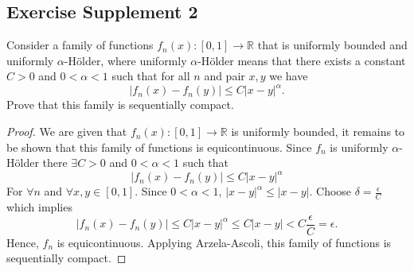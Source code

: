 \documentclass{tufte-book}
\theoremstyle{mytheoremstyle}
\theoremstyle{mylemstyle}
\theoremstyle{mydefstyle}
\begin{document}
\subsection{Exercise Supplement 2}
Consider a family of functions $f_n(x): [0,1] \to \mathbb{R}$ that is uniformly bounded and uniformly $\alpha$-H{\"o}lder, where uniformly $\alpha$-H{\"o}lder means that there exists a constant $C>0$ and $0<\alpha<1$ such that for all $n$ and pair $x,y$ we have
\[|f_n(x) - f_n(y)| \leq C|x-y|^\alpha. \]
Prove that this family is sequentially compact.

\begin{proof}
We are given that $f_n(x): [0,1] \to \mathbb{R}$ is uniformly bounded, it remains to be shown that this family of functions is equicontinuous.  Since $f_n$ is uniformly $\alpha$-H{\"o}lder there $\exists C>0$ and $0<\alpha<1$ such that 
\[|f_n(x) - f_n(y)| \leq C|x-y|^\alpha \]
For $\forall n$ and $\forall x,y \in [0,1]$.  Since $0<\alpha<1$, $|x-y|^\alpha \leq |x-y|$.  Choose $\delta = \frac{\epsilon}{C}$ which implies
\[|f_n(x) - f_n(y)| \leq C|x-y|^\alpha \leq C|x-y| < C \frac{\epsilon}{C} = \epsilon .\]
Hence, $f_n$ is equicontinuous.  Applying Arzela-Ascoli, this family of functions is sequentially compact.
\end{proof}
\end{document}

